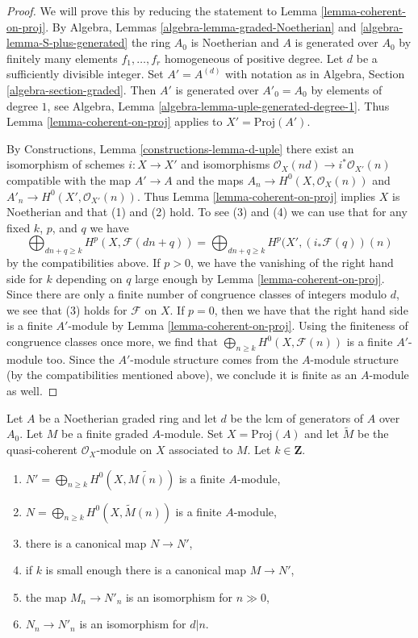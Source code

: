 \begin{proof}
We will prove this by reducing the statement to
Lemma \ref{lemma-coherent-on-proj}.
By Algebra, Lemmas \ref{algebra-lemma-graded-Noetherian} and
\ref{algebra-lemma-S-plus-generated} the ring $A_0$ is Noetherian
and $A$ is generated over $A_0$ by finitely many elements
$f_1, \ldots, f_r$ homogeneous of positive degree.
Let $d$ be a sufficiently divisible integer. Set $A' = A^{(d)}$ with notation
as in Algebra, Section \ref{algebra-section-graded}.
Then $A'$ is generated over $A'_0 = A_0$ by elements of
degree $1$, see Algebra, Lemma \ref{algebra-lemma-uple-generated-degree-1}.
Thus Lemma \ref{lemma-coherent-on-proj} applies to $X' = \text{Proj}(A')$.

\medskip\noindent
By Constructions, Lemma \ref{constructions-lemma-d-uple} there exist
an isomorphism of schemes $i : X \to X'$ and
isomorphisms $\mathcal{O}_X(nd) \to i^*\mathcal{O}_{X'}(n)$
compatible with the map $A' \to A$ and the maps
$A_n \to H^0(X, \mathcal{O}_X(n))$ and $A'_n \to H^0(X', \mathcal{O}_{X'}(n))$.
Thus Lemma \ref{lemma-coherent-on-proj} implies $X$ is Noetherian and that
(1) and (2) hold. To see (3) and (4)
we can use that for any fixed $k$, $p$, and $q$ we have
$$
\bigoplus\nolimits_{dn + q \geq k} H^p(X, \mathcal{F}(dn + q)) =
\bigoplus\nolimits_{dn + q \geq k} H^p(X', (i_*\mathcal{F}(q))(n)
$$
by the compatibilities above. If $p > 0$, we have the vanishing of the right
hand side for $k$ depending on $q$ large enough by
Lemma \ref{lemma-coherent-on-proj}. Since there are only a finite number
of congruence classes of integers modulo $d$, we see that (3) holds for
$\mathcal{F}$ on $X$. If $p = 0$, then we have that the right hand side
is a finite $A'$-module by Lemma \ref{lemma-coherent-on-proj}. Using
the finiteness of congruence classes once more, we find that
$\bigoplus_{n \geq k} H^0(X, \mathcal{F}(n))$ is a finite $A'$-module too.
Since the $A'$-module structure comes from the $A$-module structure
(by the compatibilities mentioned above), we conclude it is finite
as an $A$-module as well.
\end{proof}

\begin{lemma}
\label{lemma-recover-tail-graded-module-general}
Let $A$ be a Noetherian graded ring and let $d$ be the lcm of generators
of $A$ over $A_0$. Let $M$ be a finite graded $A$-module.
Set $X = \text{Proj}(A)$ and let $\widetilde{M}$ be
the quasi-coherent $\mathcal{O}_X$-module on $X$ associated to $M$.
Let $k \in \mathbf{Z}$.
\begin{enumerate}
\item $N' = \bigoplus_{n \geq k} H^0(X, \widetilde{M(n)})$
is a finite $A$-module,
\item $N = \bigoplus_{n \geq k} H^0(X, \widetilde{M}(n))$
is a finite $A$-module,
\item there is a canonical map $N \to N'$,
\item if $k$ is small enough there is a canonical map $M \to N'$,
\item the map $M_n \to N'_n$ is an isomorphism for $n \gg 0$,
\item $N_n \to N'_n$ is an isomorphism for $d | n$.
\end{enumerate}
\end{lemma}

